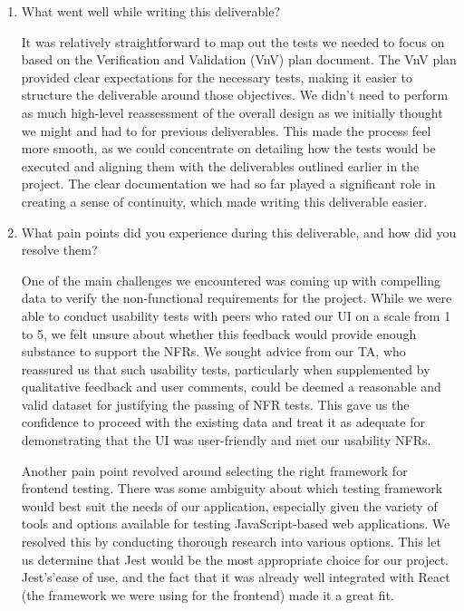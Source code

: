 \documentclass[12pt, titlepage]{article}
\begin{document}


\begin{enumerate}
  \item What went well while writing this deliverable?
  
  It was relatively straightforward to map out the tests we needed to focus on 
  based on the Verification and Validation (VnV) plan document. The VnV plan 
  provided clear expectations for the necessary tests, making it easier to 
  structure the deliverable around those objectives. We didn't need to perform 
  as much high-level reassessment of the overall design as we initially thought 
  we might and had to for previous deliverables. This made the process feel 
  more smooth, as we could concentrate on detailing how the tests would be 
  executed and aligning them with the deliverables outlined earlier in the 
  project. The clear documentation we had so far played a significant role in 
  creating a sense of continuity, which made writing this deliverable easier.

  \item What pain points did you experience during this deliverable, and how
    did you resolve them?

    One of the main challenges we encountered was coming up with compelling 
    data to verify the non-functional requirements for the project. While we 
    were able to conduct usability tests with peers who rated our UI on a scale 
    from 1 to 5, we felt unsure about whether this feedback would provide 
    enough substance to support the NFRs. We sought advice from our TA, who reassured 
    us that such usability tests, particularly when supplemented by qualitative 
    feedback and user comments, could be deemed a reasonable and valid dataset 
    for justifying the passing of NFR tests. This gave us the confidence to proceed 
    with the existing data and treat it as adequate for demonstrating that the UI 
    was user-friendly and met our usability NFRs.

    Another pain point revolved around selecting the right framework for frontend 
    testing. There was some ambiguity about which testing framework 
    would best suit the needs of our application, especially given the variety 
    of tools and options available for testing JavaScript-based web applications. 
    We resolved this by conducting thorough research into various options. This let 
    us determine that Jest would be the most appropriate choice for our project. 
    Jest's'ease of use, and the fact that it was already well integrated with React 
    (the framework we were using for the frontend) made it a great fit.


\end{enumerate}
\end{document}
